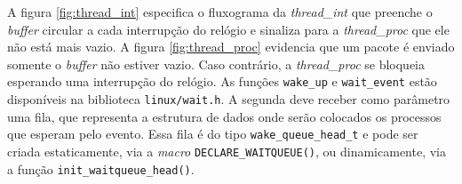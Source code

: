 \vspace{12pt}

A figura \ref{fig:thread_int} especifica o fluxograma da \textit{thread\_int}
que preenche o \textit{buffer} circular a cada interrupção do relógio e sinaliza
para a \textit{thread\_proc} que ele não está mais vazio. A figura
\ref{fig:thread_proc} evidencia que um pacote é enviado somente o
\textit{buffer} não estiver vazio. Caso contrário, a \textit{thread\_proc}
se bloqueia esperando uma interrupção do relógio. As funções \texttt{wake\_up} e
\texttt{wait\_event} estão disponíveis na biblioteca \texttt{linux/wait.h}. A
segunda deve receber como parâmetro uma fila, que representa a estrutura de
dados onde serão colocados os processos que esperam pelo evento. Essa fila é do
tipo \texttt{wake\_queue\_head\_t} e pode ser criada estaticamente, via
a \textit{macro} \texttt{DECLARE\_WAITQUEUE()}, ou dinamicamente, via a função
\texttt{init\_waitqueue\_head()}.

\FloatBarrier
			    

